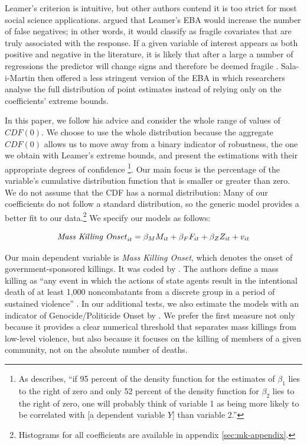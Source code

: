 Leamer's criterion is intuitive, but other authors contend it is too strict for most social science applications. \cite{sala1997just} argued that Leamer's EBA would increase the number of false negatives; in other words, it would classify as fragile covariates that are truly associated with the response. If a given variable of interest appears as both positive and negative in the literature, it is likely that after a large a number of regressions the predictor will change signs and therefore be deemed fragile \citep[179]{sala1997just}. Sala-i-Martin then offered a less stringent version of the EBA in which researchers analyse the full distribution of point estimates instead of relying only on the coefficients' extreme bounds. 

In this paper, we follow his advice and consider the whole range of values of $CDF(0)$. We choose to use the whole distribution because the aggregate $CDF(0)$ allows us to move away from a binary indicator of robustness, the one we obtain with Leamer's extreme bounds, and present the estimations with their appropriate degrees of confidence \citep[179]{sala1997just}\footnote{As \citet[179]{sala1997just} describes, ``if 95 percent of the density function for the estimates of $\beta_{1}$ lies to the right of zero and only 52 percent of the density function for $\beta_{2}$  lies to the right of zero, one will probably think of variable 1 as being more likely to be correlated with [a dependent variable $Y$] than variable 2.''}. Our main focus is the percentage of the variable's cumulative distribution function that is smaller or greater than zero. We do not assume that the CDF has a normal distribution: Many of our coefficients do not follow a standard distribution, so the generic model provides a better fit to our data.\footnote{Histograms for all coefficients are available in appendix \ref{sec:mk-appendix}.} We specify our models as follows:

\begin{equation}
\text{\textit{Mass Killing Onset}}_{it} = \beta_{M}M_{it} + \beta_{F}F_{it} + \beta_{Z}Z_{it} + v_{it}
\end{equation}

Our main dependent variable is \textit{Mass Killing Onset}, which denotes the onset of government-sponsored killings. It was coded by \cite{ulfelder2008assessing}. The authors define a mass killing as ``any event in which the actions of state agents result in the intentional death of at least 1,000 noncombatants from a discrete group in a period of sustained violence'' \citep[2]{ulfelder2008assessing}. In our additional tests, we also estimate the models with an indicator of Genocide/Politicide Onset by \cite{harff2003no}. We prefer the first measure not only because it provides a clear numerical threshold that separates mass killings from low-level violence, but also because it focuses on the killing of members of a given community, not on the absolute number of deaths. 

